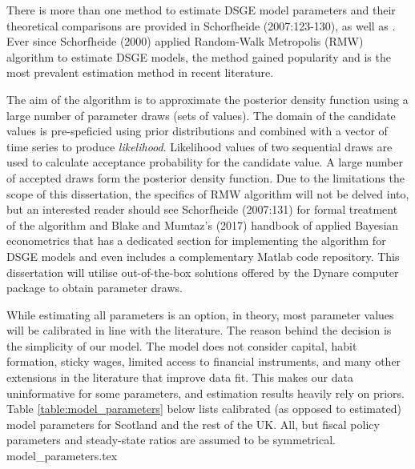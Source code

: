 There is more than one method to estimate DSGE model parameters and their theoretical comparisons are provided in Schorfheide (2007:123-130), as well as \textcite[109-110]{ricci_2019_essays}. Ever since Schorfheide (2000) applied Random-Walk Metropolis (RMW) algorithm to estimate DSGE models, the method gained popularity and is the most prevalent estimation method in recent literature. 

The aim of the algorithm is to approximate the posterior density function using a large number of parameter draws (sets of values). The domain of the candidate values is pre-speficied using prior distributions and combined with a vector of time series to produce \textit{likelihood}. Likelihood values of two sequential draws are used to calculate acceptance probability for the candidate value. A large number of accepted draws form the posterior density function. Due to the limitations the scope of this dissertation, the specifics of RMW algorithm will not be delved into, but an interested reader should see Schorfheide (2007:131) for formal treatment of the algorithm and Blake and Mumtaz's (2017) handbook of applied Bayesian econometrics that has a dedicated section for implementing the algorithm for DSGE models and even includes a complementary Matlab code repository. This dissertation will utilise out-of-the-box solutions offered by the Dynare computer package \parencite{adjemian_2021_dynare} to obtain parameter draws.

While estimating all parameters is an option, in theory, most parameter values will be calibrated in line with the literature. The reason behind the decision is the simplicity of our model. The model does not consider capital, habit formation, sticky wages, limited access to financial instruments, and many other extensions in the literature that improve data fit. This makes our data uninformative for some parameters, and estimation results heavily rely on priors. Table \ref{table:model_parameters} below lists calibrated (as opposed to estimated) model parameters for Scotland and the rest of the UK. All, but fiscal policy parameters and steady-state ratios are assumed to be symmetrical.
{model_parameters.tex}

